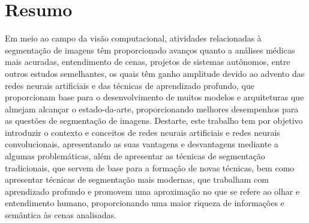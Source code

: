 \section*{Resumo}

Em meio ao campo da visão computacional, atividades relacionadas à segmentação de imagens têm proporcionado avanços quanto a análises médicas mais acuradas, entendimento de cenas, projetos de sistemas autônomos, entre outros estudos semelhantes, os quais têm ganho amplitude devido ao advento das redes neurais artificiais e das técnicas de aprendizado profundo, que proporcionam base para o desenvolvimento de muitos modelos e arquiteturas que almejam alcançar o estado-da-arte, proporcionando melhores desempenhos para as questões de segmentação de imagens.
Destarte, este trabalho tem por objetivo introduzir o contexto e conceitos de redes neurais artificiais e redes neurais convolucionais, apresentando as suas vantagens e desvantagens mediante a algumas problemáticas, além de apresentar as técnicas de segmentação tradicionais, que servem de base para a formação de novas técnicas, bem como apresentar técnicas de segmentação mais modernas, que trabalham com aprendizado profundo e promovem uma aproximação no que se refere ao olhar e entendimento humano, proporcionando uma maior riqueza de informações e semântica às cenas analisadas. 

